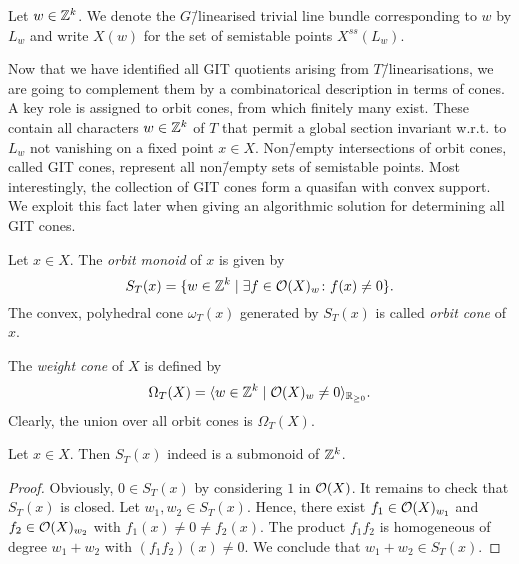\begin{notation}
	Let $w\in\mathbb{Z}^k$. We denote the $G$\=/linearised trivial line bundle corresponding to $w$ by $L_w$ and write $X(w)$ for the set of semistable points $X^{ss}(L_w)$.
\end{notation}

Now that we have identified all GIT quotients arising from $T$\=/linearisations, we are going to complement them by a combinatorical description in terms of cones. A key role is assigned to orbit cones, from which finitely many exist. These contain all characters $w\in\mathbb{Z}^k$ of $T$ that permit a global section invariant w.r.t. to $L_w$ not vanishing on a fixed point $x\in X$. Non\=/empty intersections of orbit cones, called GIT cones, represent all non\=/empty sets of semistable points. Most interestingly, the collection of GIT cones form a quasifan with convex support. We exploit this fact later when giving an algorithmic solution for determining all GIT cones.

\begin{defi}
	\label{defi:orbit_cone}
	Let $x\in X$. The \emph{orbit monoid} of $x$ is given by
	$$S_T(x) = \{w\in\mathbb{Z}^k\mid \exists f\in\mathcal{O}(X)_w\colon f(x) \neq 0\}.$$
	The convex, polyhedral cone $\omega_T(x)$ generated by $S_T(x)$ is called \emph{orbit cone} of $x$.
	
	The \emph{weight cone} of $X$ is defined by
	$$\Omega_T(X) = \langle w\in\mathbb{Z}^k\mid \mathcal{O}(X)_w \neq 0 \rangle_{\mathbb{R}_{\geq 0}}.$$
	Clearly, the union over all orbit cones is $\Omega_T(X)$.
\end{defi}

\begin{lemma}
	Let $x\in X$. Then $S_T(x)$ indeed is a submonoid of $\mathbb{Z}^k$.
\end{lemma}
\begin{proof}
	Obviously, $0\in S_T(x)$ by considering $1$ in $\mathcal{O}(X)$. It remains to check that $S_T(x)$ is closed. Let $w_1, w_2\in S_T(x)$. Hence, there exist $f_1\in\mathcal{O}(X)_{w_1}$ and $f_2\in\mathcal{O}(X)_{w_2}$ with $f_1(x) \neq 0 \neq f_2(x)$.
	The product $f_1f_2$ is homogeneous of degree $w_1+w_2$ with $(f_1f_2)(x) \neq 0$. We conclude that $w_1+w_2\in S_T(x)$.
\end{proof}

